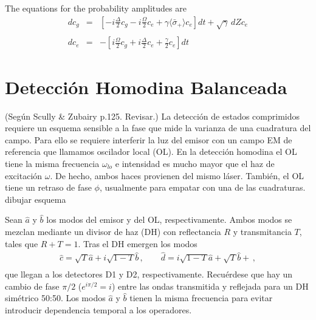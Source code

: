 \documentclass[twocolumn,aps,eqsecnum,showkeys,amsmath]{revtex4}
\providecommand{\vxp}[1]{\langle #1 \rangle}
\begin{document}
The equations for the probability amplitudes are 
%
\begin{subequations}
\label{eq:HeterodyneSSEamp}
\begin{eqnarray}
dc_g &=& \left[ -i\frac{\Delta}{2} c_g -i\frac{\Omega}{2} c_e  
	+\gamma \vxp{\bar{\sigma}_+} c_e \right] dt  +\sqrt{\gamma} \, dZ c_e 			\nonumber	\\ \\
dc_e &=& -\left[ i\frac{\Omega}{2} c_g 
 	+i\frac{\Delta}{2} c_e +\frac{\gamma}{2} c_e \right] dt
\end{eqnarray}
\end{subequations}




\section{Detecci\'on Homodina Balanceada} %
(Seg\'un Scully \& Zubairy p.125. Revisar.)
\newline La detecci\'on de estados comprimidos requiere un esquema 
sensible a la fase que mide la varianza de una cuadratura del campo. 
Para ello se requiere interferir la luz del emisor con un campo EM de 
referencia que llamamos oscilador local (OL). En la detecci\'on homodina 
el OL tiene la misma frecuencia $\omega_{lo}$ e  intensidad es mucho 
mayor que el haz de excitaci\'on $\omega$. De hecho, ambos haces 
provienen del mismo l\'aser. Tambi\'en, el OL tiene un retraso de fase 
$\phi$, usualmente para empatar con una de las cuadraturas.  
 \newline dibujar esquema

Sean $\hat{a}$ y $\hat{b}$ los modos del emisor y del OL, 
respectivamente. Ambos modos se mezclan mediante un divisor de haz 
(DH) con reflectancia $R$ y transmitancia $T$, tales que $R+T =1$.
Tras el DH emergen los modos 
%
\begin{eqnarray}
 \hat{c} = \sqrt{T} \hat{a} +i \sqrt{1-T} \hat{b} \,, 	\qquad 
 \hat{d} = i \sqrt{1-T} \hat{a} + \sqrt{T} \hat{b} + \,, 	\nonumber \\
\end{eqnarray}
que llegan a los detectores  D1 y D2, respectivamente. Recu\'erdese que 
hay un cambio de fase $\pi/2$ ($e^{i \pi/2} =i$) entre las ondas transmitida y 
reflejada para un DH sim\'etrico 50:50. Los modos $\hat{a}$ y $\hat{b}$ 
tienen la misma frecuencia para evitar introducir dependencia temporal a los operadores.  
\end{document}

